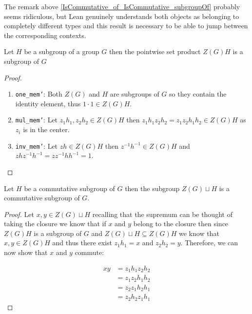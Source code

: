 \begin{remark}
  The remark above \ref{IsCommutative_of_IsCommutative_subgroupOf} probably seems ridiculous, but Lean genuinely understands both objects as belonging to completely different types and 
  this result is necessary to be able to jump between the corresponding contexts.
\end{remark}

\begin{definition}
  \label{center_mul}
  \leanok
  Let $H$ be a subgroup of a group $G$ then the pointwise set product $Z(G) H$ is a subgroup of $G$
\end{definition}
\begin{proof}
\begin{enumerate}
  \item \texttt{one_mem'}: Both $Z(G)$ and $H$ are subgroups of $G$ so they contain the identity element, thus $1 \cdot 1 \in Z(G) H$.
  \item \texttt{mul_mem'}: Let $z_1 h_1, z_2 h_2 \in Z(G) H$ then $z_1h_1z_2h_2 = z_1z_2 h_1h_2 \in Z(G) H$ as $z_i$ is in the center.
  \item \texttt{inv_mem'}: Let $zh \in Z(G) H$ then $z^{-1} h^{-1} \in Z(G) H$ and $z h z^{-1} h^{-1} = zz^{-1}h h^{-1} = 1$.

\end{enumerate}
\end{proof}


\begin{lemma}
  \label{center_mul_subset_center_mul}
  \leanok
\end{lemma}

\begin{lemma}
  \label{IsComm_of_center_join_IsComm}
  \leanok

  Let $H$ be a commutative subgroup of $G$ then the subgroup $Z(G) \sqcup H$  is a commutative subgroup of $G$.
\end{lemma}
\begin{proof}
  Let $x, y \in Z(G) \sqcup H$ recalling that the supremum can be thought of taking the closure
  we know that if $x$ and $y$ belong to the closure then since $Z(G) H$ is a subgroup of $G$ and $Z(G) \sqcup H \subseteq Z(G) H$
  we know that $x, y \in Z(G) H$ and thus there exist $z_1 h_1 = x$ and $z_2 h_2 = y$. Therefore, we can now show that $x$ and $y$ commute:

  \begin{align*}
  x y &= z_1 h_1 z_2 h_2\\
  & = z_1 z_2 h_1 h_2 \tag{as $z_2$ is in the center}\\
  &= z_2 z_1 h_2 h_1 \tag{as $H$ is a commutative subgroup}\\
  &= z_2 h_2 z_1 h_1 \tag{as $z_1$ is in the center}
  \end{align*}
\end{proof}

